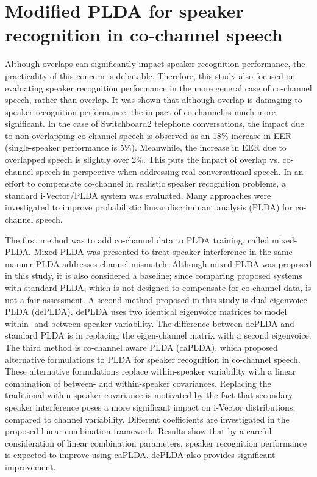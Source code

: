 \section{Modified PLDA for speaker recognition in co-channel speech}
Although overlaps can significantly impact speaker recognition performance, the practicality of this concern is debatable. 
Therefore, this study also focused on evaluating speaker recognition performance in the more general case of co-channel speech, rather than overlap. 
It was shown that although overlap is damaging to speaker recognition performance, the impact of co-channel is much more significant. 
In the case of Switchboard2 telephone conversations, the impact due to non-overlapping co-channel speech is observed as an 18\% increase in EER (single-speaker performance is 5\%). 
Meanwhile, the increase in EER due to overlapped speech is slightly over 2\%. 
This puts the impact of overlap vs. co-channel speech in perspective when addressing real conversational speech. 
In an effort to compensate co-channel in realistic speaker recognition problems, a standard i-Vector/PLDA system was evaluated. 
Many approaches were investigated to improve probabilistic linear discriminant analysis (PLDA) for co-channel speech. 

The first method was to add co-channel data to PLDA training, called mixed-PLDA. 
Mixed-PLDA was presented to treat speaker interference in the same manner PLDA addresses channel mismatch. 
Although mixed-PLDA was proposed in this study, it is also considered a baseline; since comparing proposed systems with standard PLDA, which is not designed to compensate for co-channel data, is not a fair assessment. 
A second method proposed in this study is dual-eigenvoice PLDA (dePLDA). dePLDA uses two identical eigenvoice matrices to model within- and between-speaker variability. 
The difference between dePLDA and standard PLDA is in replacing the eigen-channel matrix with a second eigenvoice. 
The third method is co-channel aware PLDA (caPLDA), which proposed alternative formulations to PLDA for speaker recognition in co-channel speech. 
These alternative formulations replace within-speaker variability with a linear combination of between- and within-speaker covariances. 
Replacing the traditional within-speaker covariance is motivated by the fact that secondary speaker interference poses a more significant impact on i-Vector distributions, compared to channel variability. 
Different coefficients are investigated in the proposed linear combination framework. 
Results show that by a careful consideration of linear combination parameters, speaker recognition performance is expected to improve using caPLDA. 
dePLDA also provides significant improvement.  

